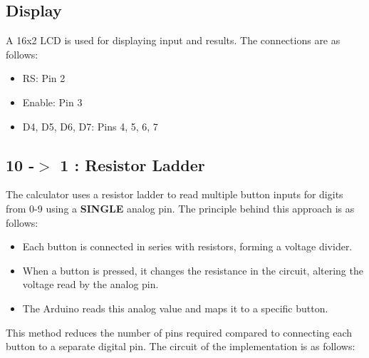 \documentclass{article}
\begin{document}
\subsection{Display}
A 16x2 LCD is used for displaying input and results. The connections are as follows:
\begin{itemize}
    \item RS: Pin 2
    \item Enable: Pin 3
    \item D4, D5, D6, D7: Pins 4, 5, 6, 7
\end{itemize}

\subsection{10 -$>$ 1 : Resistor Ladder}
The calculator uses a resistor ladder to read multiple button inputs for digits from 0-9 using a \textbf{SINGLE} analog pin. The principle behind this approach is as follows:
\begin{itemize}
    \item Each button is connected in series with resistors, forming a voltage divider.
    \item When a button is pressed, it changes the resistance in the circuit, altering the voltage read by the analog pin.
    \item The Arduino reads this analog value and maps it to a specific button.
\end{itemize}
This method reduces the number of pins required compared to connecting each button to a separate digital pin.
The circuit of the implementation is as follows:\\
\end{document}
